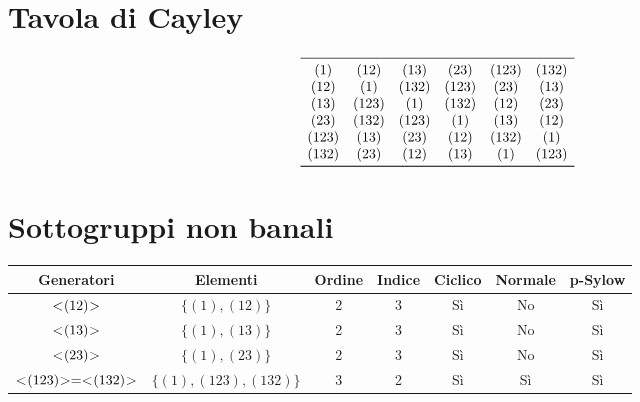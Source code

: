 \section{Tavola di Cayley}

\begin{center}
	\[
	\begin{array}{cccccc}
		\midrule
		(1) & (12) & (13) & (23) & (123) & (132) \\
		(12) & (1) & (132) & (123) & (23) & (13) \\
		(13) & (123) & (1) & (132) & (12) & (23) \\
		(23) & (132) & (123) & (1) & (13) & (12) \\
		(123) & (13) & (23) & (12) & (132) & (1) \\
		(132) & (23) & (12) & (13) & (1) & (123) \\
		\bottomrule
	\end{array}
	\]
\end{center}

\section{Sottogruppi non banali}

\begin{center}
	\begin{tabular}{ccccccc}
		\toprule
		Generatori & Elementi & Ordine & Indice & Ciclico & Normale & p-Sylow \\
		\midrule
		$< \negmedspace (12) \negmedspace >$ & $\{(1), (12)\}$ & 2 & 3 & Sì & No & Sì \\
		$< \negmedspace (13) \negmedspace >$ & $\{(1), (13)\}$ & 2 & 3 & Sì & No & Sì \\
		$< \negmedspace (23) \negmedspace >$ & $\{(1), (23)\}$ & 2 & 3 & Sì & No & Sì \\
		$< \negmedspace (123) \negmedspace > = < \negmedspace (132) \negmedspace >$ & $\{(1), (123), (132)\}$ & 3 & 2 & Sì & Sì & Sì \\
		\bottomrule
	\end{tabular}
\end{center}

